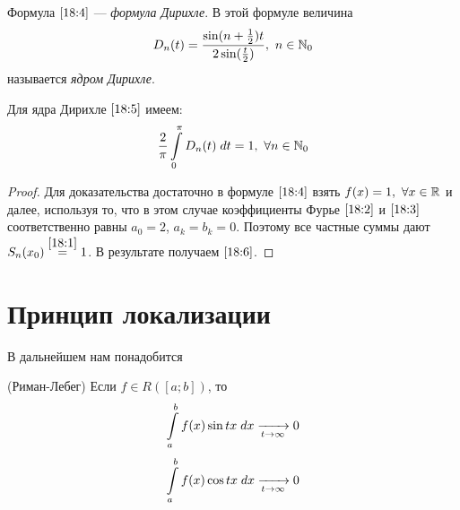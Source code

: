\documentclass[../../main.tex]{subfiles}
\begin{document}
\begin{rem}
	Формула $\eqref{18:4}$ --- \emph{формула Дирихле}. В этой формуле величина
	\begin{equation}
		\label{18:5}
		D_n(t) = \dfrac{\sin(n+\frac{1}{2})t}{2\sin(\frac{t}{2})},\ 
		n \in \N_0 
	\end{equation}
	называется \emph{ядром Дирихле}.
\end{rem}

\begin{crl*}
	Для ядра Дирихле $\eqref{18:5}$ имеем:
	\begin{equation}
		\label{18:6}
		\dfrac{2}{\pi}\int\limits_{0}^{\pi}{D_n(t)\; dt} = 1,\ \forall
		n \in \mathbb{N}_0
	\end{equation}
\end{crl*}
\begin{proof}
	Для доказательства достаточно в формуле $\eqref{18:4}$ взять
	$f(x) = 1,\ \forall x \in \mathbb{R}$ и далее, используя то, что в этом
	случае коэффициенты Фурье $\eqref{18:2}$ и $\eqref{18:3}$
	соответственно равны $a_0 = 2$, $a_k = b_k = 0$.
	Поэтому все частные суммы дают $S_n(x_0) \stackrel{\eqref{18:1}}= 1$.
	В результате получаем $\eqref{18:6}$.
\end{proof}

\section{Принцип локализации}
В дальнейшем нам понадобится
\begin{lemma}(Риман-Лебег)
	Если $f \in R([a; b])$, то
	\begin{equation}
		\label{18:7}
		\int\limits_{a}^{b}{f(x)\sin{tx}\;dx}
		\xrightarrow[t \rightarrow \infty]{} 0 
	\end{equation}
	\begin{equation}
	\label{18:8}
	\int\limits_{a}^{b}{f(x)\cos{tx}\;dx}
	\xrightarrow[t \rightarrow \infty]{} 0
	\end{equation}
\end{lemma}
\end{document}
